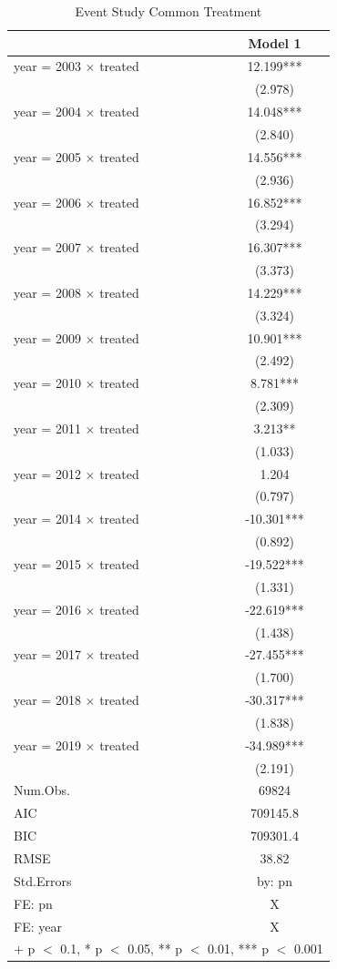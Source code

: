 \documentclass[
  12pt,
]{article}
\begin{document}
\begin{table}

\caption{\label{tab:table-4}Event Study Common Treatment}
\centering
\begin{tabular}[t]{lc}
\toprule
  & Model 1\\
\midrule
year = 2003 × treated & 12.199***\\
 & (2.978)\\
year = 2004 × treated & 14.048***\\
 & (2.840)\\
year = 2005 × treated & 14.556***\\
 & (2.936)\\
year = 2006 × treated & 16.852***\\
 & (3.294)\\
year = 2007 × treated & 16.307***\\
 & (3.373)\\
year = 2008 × treated & 14.229***\\
 & (3.324)\\
year = 2009 × treated & 10.901***\\
 & (2.492)\\
year = 2010 × treated & 8.781***\\
 & (2.309)\\
year = 2011 × treated & 3.213**\\
 & (1.033)\\
year = 2012 × treated & 1.204\\
 & (0.797)\\
year = 2014 × treated & -10.301***\\
 & (0.892)\\
year = 2015 × treated & -19.522***\\
 & (1.331)\\
year = 2016 × treated & -22.619***\\
 & (1.438)\\
year = 2017 × treated & -27.455***\\
 & (1.700)\\
year = 2018 × treated & -30.317***\\
 & (1.838)\\
year = 2019 × treated & -34.989***\\
 & (2.191)\\
\midrule
Num.Obs. & 69824\\
AIC & 709145.8\\
BIC & 709301.4\\
RMSE & 38.82\\
Std.Errors & by: pn\\
FE: pn & X\\
FE: year & X\\
\bottomrule
\multicolumn{2}{l}{\rule{0pt}{1em}+ p $<$ 0.1, * p $<$ 0.05, ** p $<$ 0.01, *** p $<$ 0.001}\\
\end{tabular}
\end{table}
\end{document}
